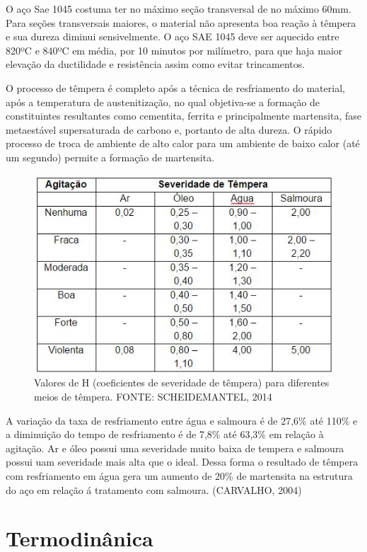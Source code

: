 O aço Sae 1045 costuma ter no máximo seção transversal de no máximo 60mm. Para seções transversais maiores, o material não apresenta boa reação à têmpera e sua dureza diminui sensivelmente. O aço SAE 1045 deve ser aquecido entre 820ºC e 840ºC em média, por 10 minutos por milímetro, para que haja maior elevação da ductilidade e resistência assim como evitar trincamentos.

O processo de têmpera é completo após a técnica de resfriamento do material, após a temperatura de austenitização, no qual objetiva-se a formação de constituintes resultantes como cementita, ferrita e principalmente martensita, fase metaestável supersaturada de carbono e, portanto de alta dureza. O rápido processo de troca de ambiente de alto calor para um ambiente de baixo calor (até um segundo) permite a formação de martensita.

\begin{figure}[!h]
	\centering
	\label{tab_valoresH}
	\includegraphics[keepaspectratio=true,scale=0.8]{figuras/tab_valoresH.JPG}
	\caption{Valores de H (coeficientes de severidade de têmpera) para diferentes meios de têmpera. FONTE: SCHEIDEMANTEL, 2014}
\end{figure}

A variação da taxa de resfriamento entre água e salmoura é de 27,6\% até 110\% e a diminuição do tempo de resfriamento é de 7,8\% até 63,3\% em relação à agitação. Ar e óleo possui uma severidade muito baixa de tempera e salmoura possui uam severidade mais alta que o ideal. Dessa forma o resultado de têmpera com resfriamento em água gera um aumento de 20\% de martensita na estrutura do aço em relação á tratamento com salmoura. (CARVALHO, 2004)


\section{Termodinânica}

